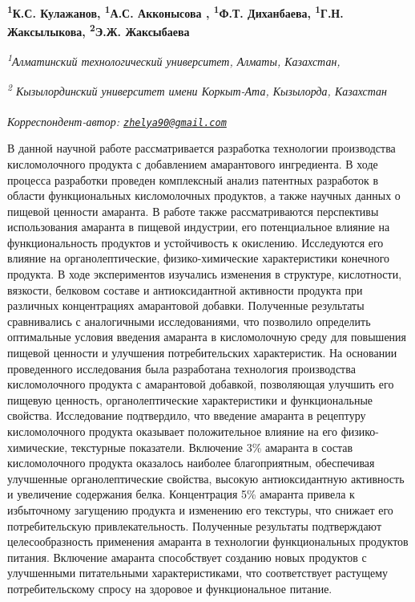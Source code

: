 
\begin{articleheader}

{\bfseries
\textsuperscript{1}К.С. Кулажанов\authorid,
\textsuperscript{1}А.С. Акконысова\textsuperscript{\envelope } \authorid,
\textsuperscript{1}Ф.Т. Диханбаева\authorid,
\textsuperscript{1}Г.Н. Жаксылыкова\authorid,
\textsuperscript{2}Э.Ж. Жаксыбаева\authorid}
\end{articleheader}

\begin{affiliation}
\emph{\textsuperscript{1}Алматинский технологический университет, Алматы, Казахстан,}

\emph{\textsuperscript{2} Кызылординский университет имени Коркыт-Ата, Кызылорда, Казахстан}

\raggedright \textsuperscript{\envelope }{\em Корреспондент-автор: \href{mailto:zhelya90@gmail.com}{\nolinkurl{zhelya90@gmail.com}}}
\end{affiliation}

В данной научной работе рассматривается разработка технологии
производства кисломолочного продукта с добавлением амарантового
ингредиента. В ходе процесса разработки проведен комплексный анализ
патентных разработок в области функциональных кисломолочных продуктов, а
также научных данных о пищевой ценности амаранта. В работе также
рассматриваются перспективы использования амаранта в пищевой индустрии,
его потенциальное влияние на функциональность продуктов и устойчивость к
окислению. Исследуются его влияние на органолептические,
физико-химические характеристики конечного продукта. В ходе
экспериментов изучались изменения в структуре, кислотности, вязкости,
белковом составе и антиоксидантной активности продукта при различных
концентрациях амарантовой добавки. Полученные результаты сравнивались с
аналогичными исследованиями, что позволило определить оптимальные
условия введения амаранта в кисломолочную среду для повышения пищевой
ценности и улучшения потребительских характеристик. На основании
проведенного исследования была разработана технология производства
кисломолочного продукта с амарантовой добавкой, позволяющая улучшить его
пищевую ценность, органолептические характеристики и функциональные
свойства. Исследование подтвердило, что введение амаранта в рецептуру
кисломолочного продукта оказывает положительное влияние на его
физико-химические, текстурные показатели. Включение 3\% амаранта в
состав кисломолочного продукта оказалось наиболее благоприятным,
обеспечивая улучшенные органолептические свойства, высокую
антиоксидантную активность и увеличение содержания белка. Концентрация
5\% амаранта привела к избыточному загущению продукта и изменению его
текстуры, что снижает его потребительскую привлекательность. Полученные
результаты подтверждают целесообразность применения амаранта в
технологии функциональных продуктов питания. Включение амаранта
способствует созданию новых продуктов с улучшенными питательными
характеристиками, что соответствует растущему потребительскому спросу на
здоровое и функциональное питание.

